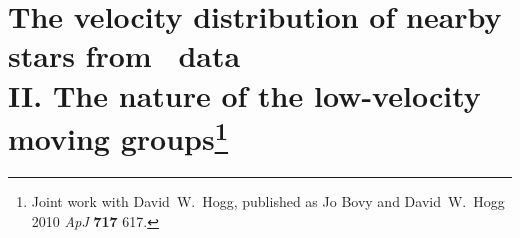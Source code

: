 
\chapter[The velocity distribution of nearby stars from \Hipparcos\ data II. The nature of the low-velocity moving groups]{The velocity distribution of nearby stars from \Hipparcos\ data\\
II. The nature of the low-velocity moving
groups\protect\footnote{Joint work with David~W.~Hogg, published as Jo Bovy and David~W.~Hogg 2010 \emph{ApJ} {\bf 717} 617.}}



